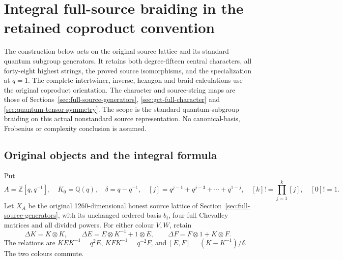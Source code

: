 \section{Integral full-source braiding in the retained coproduct convention}
\label{sec:fb-full-source-braiding}

The construction below acts on the original source lattice and its
standard quantum subgroup generators. It retains both degree-fifteen
central characters, all forty-eight highest strings, the proved
source isomorphisms, and the specialization at $q=1$. The complete
intertwiner, inverse, hexagon and braid calculations use the original
coproduct orientation. The character and source-string maps are those
of Sections~\ref{sec:full-source-generators},
\ref{sec:gct-full-character} and \ref{sec:quantum-tensor-symmetry}.
The scope is the standard quantum-subgroup braiding on this actual
nonstandard source representation. No canonical-basis, Frobenius or
complexity conclusion is assumed.

\subsection{Original objects and the integral formula}
\label{sec:fb-objects}

Put
\[
 A=\mathbb Z[q,q^{-1}],\quad K_0=\mathbb Q(q),\quad
 \delta=q-q^{-1},\quad [j]=q^{j-1}+q^{j-3}+\cdots+q^{1-j},
 \quad [k]!=\prod_{j=1}^k[j],\quad[0]!=1.
\]
Let \(X_A\) be the original 1260-dimensional honest source lattice of
Section~\ref{sec:full-source-generators}, with its unchanged ordered basis
\(b_i\), four full Chevalley matrices and all divided powers. For either colour \(V,W\), retain
\begin{equation}\tag{FB1}\label{eq:fb-1}
\Delta K=K\otimes K,\qquad
 \Delta E=E\otimes K^{-1}+1\otimes E,\qquad
 \Delta F=F\otimes1+K\otimes F.
\end{equation}
The relations are \(KEK^{-1}=q^2E\), \(KFK^{-1}=q^{-2}F\), and
\([E,F]=(K-K^{-1})/\delta\). The two colours commute.

